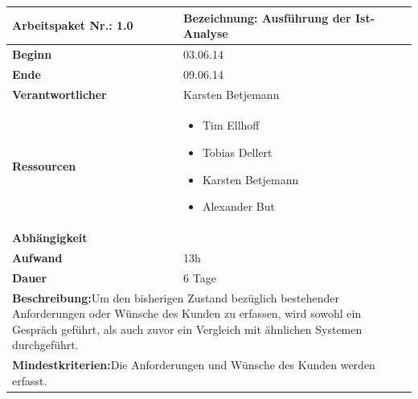 \documentclass[fontsize=12pt,paper=a4,twoside]{scrartcl}
\begin{document}
	\begin{tabular}{|p{5.3cm}|p{9.7cm}|}\hline
		\textbf{Arbeitspaket Nr.:} 1.0 & \textbf{Bezeichnung:} Ausführung der Ist-Analyse\\  \hline \hline
		\textbf{Beginn} & 03.06.14\\ \hline
		\textbf{Ende} & 09.06.14\\ \hline
		\textbf{Verantwortlicher} & Karsten Betjemann\\ \hline
		\textbf{Ressourcen} & \begin{itemize}
			\item Tim Ellhoff
			\item Tobias Dellert
			\item Karsten Betjemann
			\item Alexander But
		\end{itemize}    \\ \hline
		\textbf{Abhängigkeit} & \\ \hline
		\textbf{Aufwand} & 13h\\ \hline
		\textbf{Dauer} & 6 Tage\\ \hline
		\multicolumn{2}{|p{15cm}|}{\textbf{Beschreibung:}\newline Um den bisherigen Zustand bezüglich bestehender Anforderungen oder Wünsche des Kunden zu erfassen, wird sowohl ein Gespräch geführt, als auch zuvor ein Vergleich mit ähnlichen Systemen durchgeführt.   }\\ \hline
		\multicolumn{2}{|p{15cm}|}{\textbf{Mindestkriterien:}\newline Die Anforderungen und Wünsche des Kunden werden erfasst.}\\ \hline
	\end{tabular}
	
	\begin{verbatim} 
	\end{verbatim}
	
\end{document}
